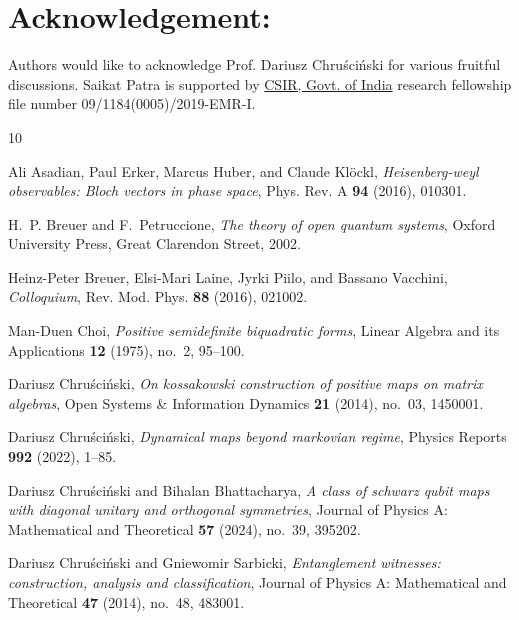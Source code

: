 \documentclass[12pt]{amsart}
\numberwithin{equation}{section}
\begin{document}
\section{Acknowledgement:}

Authors would like to acknowledge Prof. Dariusz Chru\'sci\'nski for various fruitful discussions.  Saikat Patra is supported by \href{https://www.csir.res.in/}{{\sf CSIR, Govt. of India}} research fellowship file number 09/1184(0005)/2019-EMR-I.


\providecommand{\bysame}{\leavevmode\hbox to3em{\hrulefill}\thinspace}
\providecommand{\MR}{\relax\ifhmode\unskip\space\fi MR }
\providecommand{\MRhref}[2]{%
  \href{http://www.ams.org/mathscinet-getitem?mr=#1}{#2}
}
\providecommand{\href}[2]{#2}
\begin{thebibliography}{10}

Ali Asadian, Paul Erker, Marcus Huber, and Claude Kl\"ockl,
  \emph{Heisenberg-weyl observables: Bloch vectors in phase space}, Phys. Rev.
  A \textbf{94} (2016), 010301.

H.~P. Breuer and F.~Petruccione, \emph{The theory of open quantum systems},
  Oxford University Press, Great Clarendon Street, 2002.

Heinz-Peter Breuer, Elsi-Mari Laine, Jyrki Piilo, and Bassano Vacchini,
  \emph{Colloquium}, Rev. Mod. Phys. \textbf{88} (2016), 021002.

Man-Duen Choi, \emph{Positive semidefinite biquadratic forms}, Linear Algebra
  and its Applications \textbf{12} (1975), no.~2, 95--100.

Dariusz Chru\'{s}ci\'{n}ski, \emph{On kossakowski construction of positive maps
  on matrix algebras}, Open Systems \& Information Dynamics \textbf{21} (2014),
  no.~03, 1450001.

Dariusz Chru{\'{s}}ci{\'{n}}ski, \emph{Dynamical maps beyond markovian regime},
  Physics Reports \textbf{992} (2022), 1--85.

Dariusz Chru{\'s}ci{\'n}ski and Bihalan Bhattacharya, \emph{A class of schwarz
  qubit maps with diagonal unitary and orthogonal symmetries}, Journal of
  Physics A: Mathematical and Theoretical \textbf{57} (2024), no.~39, 395202.

Dariusz Chru\'{s}ci\'{n}ski and Gniewomir Sarbicki, \emph{Entanglement
  witnesses: construction, analysis and classification}, Journal of Physics A:
  Mathematical and Theoretical \textbf{47} (2014), no.~48, 483001.


\end{thebibliography}
\end{document}
